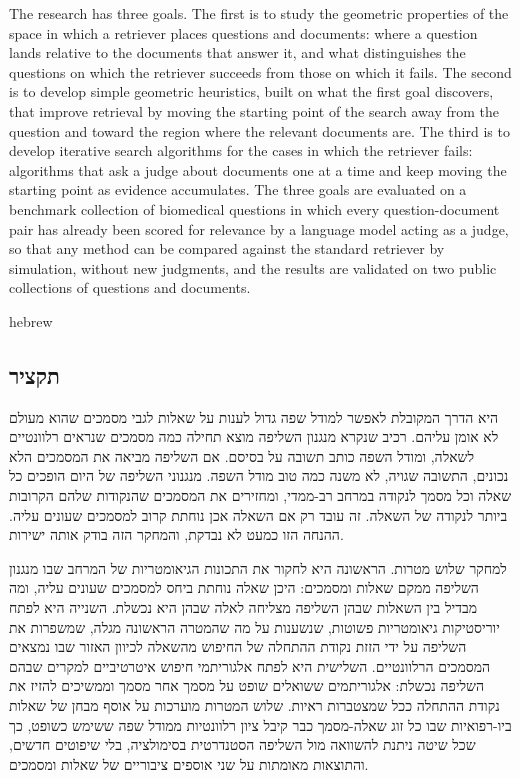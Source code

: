 \documentclass[12pt,a4paper]{article}
\begin{document}
The research has three goals. The first is to study the geometric properties of the space in which a retriever places questions and documents: where a question lands relative to the documents that answer it, and what distinguishes the questions on which the retriever succeeds from those on which it fails. The second is to develop simple geometric heuristics, built on what the first goal discovers, that improve retrieval by moving the starting point of the search away from the question and toward the region where the relevant documents are. The third is to develop iterative search algorithms for the cases in which the retriever fails: algorithms that ask a judge about documents one at a time and keep moving the starting point as evidence accumulates. The three goals are evaluated on a benchmark collection of biomedical questions in which every question-document pair has already been scored for relevance by a language model acting as a judge, so that any method can be compared against the standard retriever by simulation, without new judgments, and the results are validated on two public collections of questions and documents.

\begin{otherlanguage*}{hebrew}\sloppy\setlength{\emergencystretch}{3em}
\subsection*{\texthebrew{תקציר}}
\textenglish{} היא הדרך המקובלת לאפשר למודל שפה גדול לענות על שאלות לגבי מסמכים שהוא מעולם לא אומן עליהם. רכיב שנקרא מנגנון השליפה מוצא תחילה כמה מסמכים שנראים רלוונטיים לשאלה, ומודל השפה כותב תשובה על בסיסם. אם השליפה מביאה את המסמכים הלא נכונים, התשובה שגויה, לא משנה כמה טוב מודל השפה. מנגנוני השליפה של היום הופכים כל שאלה וכל מסמך לנקודה במרחב רב-ממדי, ומחזירים את המסמכים שהנקודות שלהם הקרובות ביותר לנקודה של השאלה. זה עובד רק אם השאלה אכן נוחתת קרוב למסמכים שעונים עליה. ההנחה הזו כמעט לא נבדקת, והמחקר הזה בודק אותה ישירות.

למחקר שלוש מטרות. הראשונה היא לחקור את התכונות הגיאומטריות של המרחב שבו מנגנון השליפה ממקם שאלות ומסמכים: היכן שאלה נוחתת ביחס למסמכים שעונים עליה, ומה מבדיל בין השאלות שבהן השליפה מצליחה לאלה שבהן היא נכשלת. השנייה היא לפתח יוריסטיקות גיאומטריות פשוטות, שנשענות על מה שהמטרה הראשונה מגלה, שמשפרות את השליפה על ידי הזזת נקודת ההתחלה של החיפוש מהשאלה לכיוון האזור שבו נמצאים המסמכים הרלוונטיים. השלישית היא לפתח אלגוריתמי חיפוש איטרטיביים למקרים שבהם השליפה נכשלת: אלגוריתמים ששואלים שופט על מסמך אחר מסמך וממשיכים להזיז את נקודת ההתחלה ככל שמצטברות ראיות. שלוש המטרות מוערכות על אוסף מבחן של שאלות ביו-רפואיות שבו כל זוג שאלה-מסמך כבר קיבל ציון רלוונטיות ממודל שפה ששימש כשופט, כך שכל שיטה ניתנת להשוואה מול השליפה הסטנדרטית בסימולציה, בלי שיפוטים חדשים, והתוצאות מאומתות על שני אוספים ציבוריים של שאלות ומסמכים.
\end{otherlanguage*}
\end{document}
